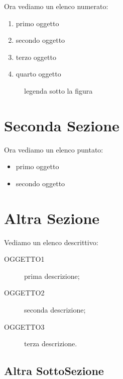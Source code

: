 \documentclass[12pt,a4paper,openright,twoside]{report}
\begin{document}
Ora vediamo un elenco numerato:         %
\begin{enumerate}
\item primo oggetto
\item secondo oggetto
\item terzo oggetto
\item quarto oggetto
\end{enumerate}

\begin{figure}[h]                       %
\begin{center}                          %
%
\caption[legenda elenco figure]{legenda sotto la figura}\label{fig:prima}
\end{center}
\end{figure}

\section{Seconda Sezione}
Ora vediamo un elenco puntato:
\begin{itemize}                         %
\item primo oggetto
\item secondo oggetto
\end{itemize}

\section{Altra Sezione}
Vediamo un elenco descrittivo:
\begin{description}                     %
  \item[OGGETTO1] prima descrizione;
  \item[OGGETTO2] seconda descrizione;
  \item[OGGETTO3] terza descrizione.
\end{description}
\subsection{Altra SottoSezione}
\end{document}
